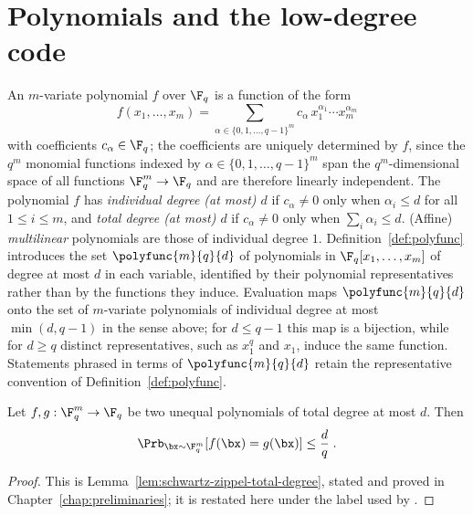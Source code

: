\section{Polynomials and the low-degree code}
\label{sec:ld-encoding}

\begin{definition}\label{def:polynomials-degree}
	An $m$-variate polynomial $f$ over $\F_q$ is a function of the form
	\[
		f(x_1, \dots, x_m) = \sum_{\alpha \in \{0, 1, \dots, q-1\}^m}
		c_\alpha\, x_1^{\alpha_1} \cdots x_m^{\alpha_m}
	\]
	with coefficients $c_\alpha \in \F_q$; the coefficients are uniquely
	determined by $f$, since the $q^m$ monomial functions indexed by
	$\alpha \in \{0, 1, \dots, q-1\}^m$ span the $q^m$-dimensional space of all
	functions $\F_q^m \to \F_q$ and are therefore linearly independent. The
	polynomial $f$ has \emph{individual degree (at most) $d$} if
	$c_\alpha \neq 0$ only when $\alpha_i \le d$ for all $1 \le i \le m$, and
	\emph{total degree (at most) $d$} if $c_\alpha \neq 0$ only when
	$\sum_i \alpha_i \le d$. (Affine) \emph{multilinear} polynomials are those
	of individual degree $1$.
	Definition~\ref{def:polyfunc} introduces the set $\polyfunc{m}{q}{d}$ of
	polynomials in $\F_q[x_1, \dots, x_m]$ of degree at most $d$ in each
	variable, identified by their polynomial representatives rather than by the
	functions they induce. Evaluation maps $\polyfunc{m}{q}{d}$ onto the set of
	$m$-variate polynomials of individual degree at most $\min(d, q-1)$ in the
	sense above; for $d \le q-1$ this map is a bijection, while for $d \ge q$
	distinct representatives, such as $x_1^q$ and $x_1$, induce the same
	function. Statements phrased in terms of $\polyfunc{m}{q}{d}$ retain the
	representative convention of Definition~\ref{def:polyfunc}.
\end{definition}

\begin{lemma}\label{lem:schwartz-zippel}
	\leanok
	Let $f, g : \F_q^m \to \F_q$ be two unequal polynomials of total degree at
	most $d$. Then
	\[
		\Prb_{\bx \sim \F_q^m}[f(\bx) = g(\bx)] \le \frac{d}{q}\;.
	\]
\end{lemma}
\begin{proof}
	\leanok
	This is Lemma~\ref{lem:schwartz-zippel-total-degree}, stated and proved in
	Chapter~\ref{chap:preliminaries}; it is restated here under the label used
	by \cite{Ji2020MIPStar}.
\end{proof}

